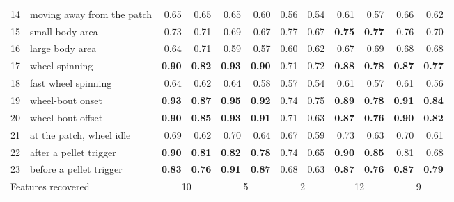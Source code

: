 \begin{tabular*}{\linewidth}{@{\extracolsep{\fill}}rlrrrrrrrrrr@{}}
14 & moving away from the patch & 0.65 & 0.65 & 0.65 & 0.60 & 0.56 & 0.54 & 0.61 & 0.57 & 0.66 & 0.62 \\
15 & small body area & 0.73 & 0.71 & 0.69 & 0.67 & 0.77 & 0.67 & \textbf{0.75} & \textbf{0.77} & 0.76 & 0.70 \\
16 & large body area & 0.64 & 0.71 & 0.59 & 0.57 & 0.60 & 0.62 & 0.67 & 0.69 & 0.68 & 0.68 \\
17 & wheel spinning & \textbf{0.90} & \textbf{0.82} & \textbf{0.93} & \textbf{0.90} & 0.71 & 0.72 & \textbf{0.88} & \textbf{0.78} & \textbf{0.87} & \textbf{0.77} \\
18 & fast wheel spinning & 0.64 & 0.62 & 0.64 & 0.58 & 0.57 & 0.54 & 0.61 & 0.57 & 0.61 & 0.56 \\
19 & wheel-bout onset & \textbf{0.93} & \textbf{0.87} & \textbf{0.95} & \textbf{0.92} & 0.74 & 0.75 & \textbf{0.89} & \textbf{0.78} & \textbf{0.91} & \textbf{0.84} \\
20 & wheel-bout offset & \textbf{0.90} & \textbf{0.85} & \textbf{0.93} & \textbf{0.91} & 0.71 & 0.63 & \textbf{0.87} & \textbf{0.76} & \textbf{0.90} & \textbf{0.82} \\
21 & at the patch, wheel idle & 0.69 & 0.62 & 0.70 & 0.64 & 0.67 & 0.59 & 0.73 & 0.63 & 0.70 & 0.61 \\
22 & after a pellet trigger & \textbf{0.90} & \textbf{0.81} & \textbf{0.82} & \textbf{0.78} & 0.74 & 0.65 & \textbf{0.90} & \textbf{0.85} & 0.81 & 0.68 \\
23 & before a pellet trigger & \textbf{0.83} & \textbf{0.76} & \textbf{0.91} & \textbf{0.87} & 0.68 & 0.63 & \textbf{0.87} & \textbf{0.76} & \textbf{0.87} & \textbf{0.79} \\
\midrule
\multicolumn{2}{l}{Features recovered} & \multicolumn{2}{c}{10} & \multicolumn{2}{c}{5} & \multicolumn{2}{c}{2} & \multicolumn{2}{c}{12} & \multicolumn{2}{c}{9} \\
\bottomrule
\end{tabular*}
